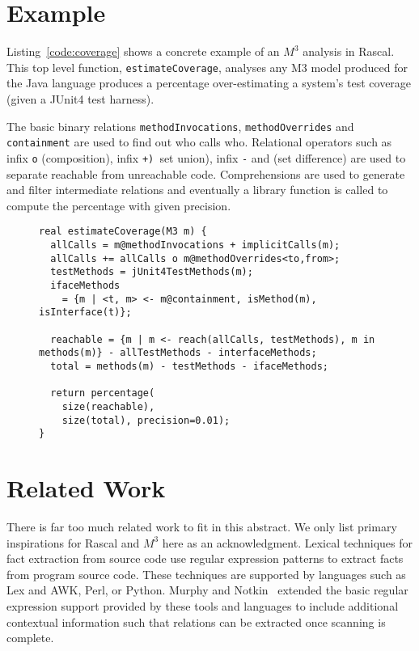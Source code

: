\documentclass[conference]{IEEEtran}
\newcommand{\mthree}{\ensuremath{M^3}\xspace}
\begin{document}
\section{Example}

Listing~\ref{code:coverage} shows a concrete example of an \mthree analysis in Rascal. This top level function, \lstinline{estimateCoverage}, analyses any M3 model produced for the Java language produces a percentage over-estimating a system's test coverage  (given a JUnit4 test harness). 

The basic binary relations \lstinline{methodInvocations},  \lstinline{methodOverrides} and \lstinline{containment} are used to find out who calls who. Relational operators such as infix \lstinline{o} (composition), infix \lstinline(+) (set union), infix \lstinline{-} and (set difference) are used to separate reachable from unreachable code. Comprehensions are used to generate and filter intermediate relations and eventually a library function is called to compute the percentage with given precision. 


\begin{figure}[t]

\begin{lstlisting}[caption=Statically estimating test coverage using \mthree., label=code:coverage,language=rascal]
real estimateCoverage(M3 m) {
  allCalls = m@methodInvocations + implicitCalls(m);
  allCalls += allCalls o m@methodOverrides<to,from>;
  testMethods = jUnit4TestMethods(m);
  ifaceMethods 
    = {m | <t, m> <- m@containment, isMethod(m), isInterface(t)};
  
  reachable = {m | m <- reach(allCalls, testMethods), m in methods(m)} - allTestMethods - interfaceMethods;
  total = methods(m) - testMethods - ifaceMethods;
  
  return percentage(
    size(reachable), 
    size(total), precision=0.01);
}
\end{lstlisting}
\end{figure}

\section{Related Work}

There is far too much related work to fit in this abstract. We only list primary inspirations for Rascal and \mthree here as an acknowledgment.
%
Lexical techniques for fact extraction from source code use regular expression patterns to extract facts from
program source code. These techniques are supported by languages such as Lex and AWK, Perl, or Python. Murphy and
Notkin~\cite{MurphyNotkin95,DBLP:journals/tosem/MurphyN96} extended the
basic regular expression support provided by these tools and languages
to include additional contextual information such that relations can be extracted once scanning is complete.
\end{document}
